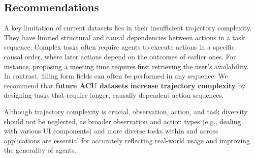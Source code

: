 \subsection{Recommendations}

A key limitation of current datasets lies in their insufficient trajectory complexity. They have limited structural and causal dependencies between actions in a task sequence. Complex tasks often require agents to execute actions in a specific causal order, where later actions depend on the outcomes of earlier ones. For instance, proposing a meeting time requires first retrieving the user's availability. In contrast, filling form fields can often be performed in any sequence. We recommend that \textbf{future ACU datasets increase trajectory complexity} by designing tasks that require longer, causally dependent action sequences.

Although trajectory complexity is crucial, observation, action, and task diversity should not be neglected, as broader observation and action types (e.g., dealing with various UI components) and more diverse tasks within and across applications are essential for accurately reflecting real-world usage and improving the generality of agents.
